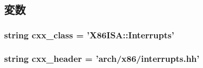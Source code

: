 \subsection{変数}
\hypertarget{classX86LocalApic_1_1X86LocalApic_a58cd55cd4023648e138237cfc0822ae3}{
\subsubsection[{cxx\_\-class}]{\setlength{\rightskip}{0pt plus 5cm}string {\bf cxx\_\-class} = '{\bf X86ISA::Interrupts}'}}
\label{classX86LocalApic_1_1X86LocalApic_a58cd55cd4023648e138237cfc0822ae3}
\hypertarget{classX86LocalApic_1_1X86LocalApic_a17da7064bc5c518791f0c891eff05fda}{
\subsubsection[{cxx\_\-header}]{\setlength{\rightskip}{0pt plus 5cm}string {\bf cxx\_\-header} = 'arch/x86/interrupts.hh'}}
\label{classX86LocalApic_1_1X86LocalApic_a17da7064bc5c518791f0c891eff05fda}


